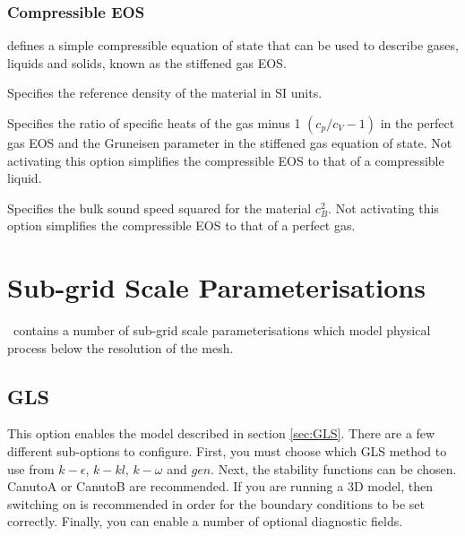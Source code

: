 \subsubsection{Compressible EOS}\label{sec:Multi-material compressible EOS}
 defines a simple compressible equation of state that can be used to describe gases, liquids and solids, known as the stiffened gas EOS. %

\begin{description}
\item{} Specifies the reference density of the material in SI units.
\item{} Specifies the ratio of specific heats of the gas minus 1 $(c_p/c_V-1)$ in the perfect gas EOS and the Gruneisen parameter in the stiffened gas equation of state. Not activating this option simplifies the compressible EOS to that of a compressible liquid.
\item{} Specifies the bulk sound speed squared for the material $c_B^2$. Not activating this option simplifies the compressible EOS to that of a perfect gas.
\end{description}

\section{Sub-grid Scale Parameterisations}

\fluidity\ contains a number of sub-grid scale parameterisations which model physical process below the resolution of the mesh.

\subsection{GLS}

This option enables the model described in section \ref{sec:GLS}. There are a few different 
sub-options to configure. First, you must choose which GLS method to use 
from $k-\epsilon$, $k-kl$, $k-\omega$ and $gen$. Next, the stability functions
can be chosen. CanutoA or CanutoB are recommended. If you are running a 3D model, then switching on  
 is recommended in order for the boundary conditions to be set correctly. 
Finally, you can enable a number of optional diagnostic fields.

